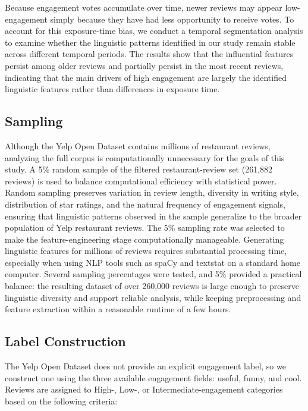 \documentclass[12pt]{article}
\begin{document}
Because engagement votes accumulate over time, newer reviews may appear low-engagement simply because they have had less opportunity to receive votes. To account for this exposure-time bias, we conduct a temporal segmentation analysis to examine whether the linguistic patterns identified in our study remain stable across different temporal periods. The results show that the influential features persist among older reviews and partially persist in the most recent reviews, indicating that the main drivers of high engagement are largely the identified linguistic features rather than differences in exposure time.

\subsection{Sampling}

Although the Yelp Open Dataset contains millions of restaurant reviews, analyzing the full corpus is computationally unnecessary for the goals of this study. A 5\% random sample of the filtered restaurant-review set (261,882 reviews) is used to balance computational efficiency with statistical power. Random sampling preserves variation in review length, diversity in writing style, distribution of star ratings, and the natural frequency of engagement signals, ensuring that linguistic patterns observed in the sample generalize to the broader population of Yelp restaurant reviews. The 5\% sampling rate was selected to make the feature-engineering stage computationally manageable. Generating linguistic features for millions of reviews requires substantial processing time, especially when using NLP tools such as spaCy and textstat on a standard home computer. Several sampling percentages were tested, and 5\% provided a practical balance: the resulting dataset of over 260,000 reviews is large enough to preserve linguistic diversity and support reliable analysis, while keeping preprocessing and feature extraction within a reasonable runtime of a few hours.

\subsection{Label Construction}

The Yelp Open Dataset does not provide an explicit engagement label, so we construct one using the three available engagement fields: useful, funny, and cool. Reviews are assigned to High-, Low-, or Intermediate-engagement categories based on the following criteria:
\end{document}
